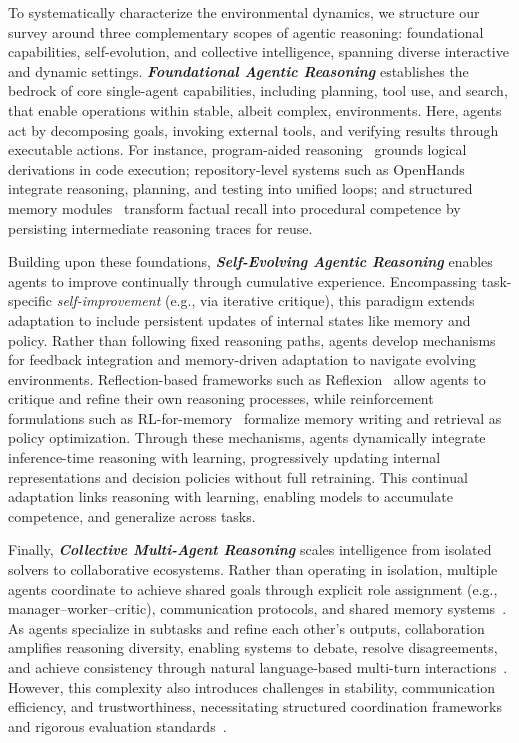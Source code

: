 To systematically characterize the environmental dynamics, we structure our survey around three complementary scopes of agentic reasoning: foundational capabilities, self-evolution, and collective intelligence, spanning diverse interactive and dynamic settings. \emph{\textbf{Foundational Agentic Reasoning}} establishes the bedrock of core single-agent capabilities, including planning, tool use, and search, that enable operations within stable, albeit complex, environments. Here, agents act by decomposing goals, invoking external tools, and verifying results through executable actions. For instance, program-aided reasoning~\cite{gao2023pal} grounds logical derivations in code execution; repository-level systems such as OpenHands~\cite{wang2024openhands} integrate reasoning, planning, and testing into unified loops; and structured memory modules~\cite{chhikara2025mem0,li2025memos} transform factual recall into procedural competence by persisting intermediate reasoning traces for reuse.

Building upon these foundations, \emph{\textbf{Self-Evolving Agentic Reasoning}} enables agents to improve continually through cumulative experience. Encompassing task-specific \emph{self-improvement} (e.g., via iterative critique), this paradigm extends adaptation to include persistent updates of internal states like memory and policy. Rather than following fixed reasoning paths, agents develop mechanisms for feedback integration and memory-driven adaptation to navigate evolving environments. Reflection-based frameworks such as Reflexion~\cite{shinn2023reflexion} allow agents to critique and refine their own reasoning processes, while reinforcement formulations such as RL-for-memory~\cite{yan2025memoryr1} formalize memory writing and retrieval as policy optimization. Through these mechanisms, agents dynamically integrate inference-time reasoning with learning, progressively updating internal representations and decision policies without full retraining. This continual adaptation links reasoning with learning, enabling models to accumulate competence, and generalize across tasks.

Finally, \emph{\textbf{Collective Multi-Agent Reasoning}} scales intelligence from isolated solvers to collaborative ecosystems. Rather than operating in isolation, multiple agents coordinate to achieve shared goals through explicit role assignment (e.g., manager–worker–critic), communication protocols, and shared memory systems~\cite{chen2023autoagents,hong2024metagpt}. As agents specialize in subtasks and refine each other’s outputs, collaboration amplifies reasoning diversity, enabling systems to debate, resolve disagreements, and achieve consistency through natural language-based multi-turn interactions~\cite{unleashing2024,wang2024battleagentbench}. However, this complexity also introduces challenges in stability, communication efficiency, and trustworthiness, necessitating structured coordination frameworks and rigorous evaluation standards~\cite{xiao2023agentbench,zhu2025multiagentbench}.


